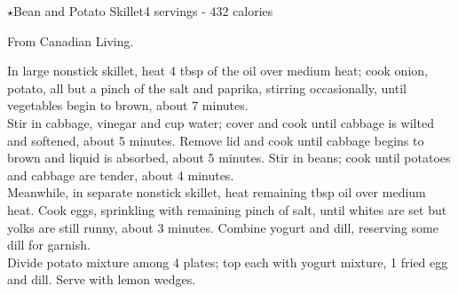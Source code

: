 \begin{recipe}{\texorpdfstring{$\star$}{str}Bean and Potato Skillet}{4 servings - 432 calories}{}

\freeform From Canadian Living.


In large nonstick skillet, heat 4 tbsp of the oil over medium heat; cook onion, potato, all but a pinch of the salt and paprika, stirring occasionally, until vegetables begin to brown, about 7 minutes.\\

Stir in cabbage, vinegar and  cup water; cover and cook until cabbage is wilted and softened, about 5 minutes. Remove lid and cook until cabbage begins to brown and liquid is absorbed, about 5 minutes. Stir in beans; cook until potatoes and cabbage are tender, about 4 minutes.\\

Meanwhile, in separate nonstick skillet, heat remaining  tbsp oil over medium heat. Cook eggs, sprinkling with remaining pinch of salt, until whites are set but yolks are still runny, about 3 minutes. Combine yogurt and dill, reserving some dill for garnish.\\

Divide potato mixture among 4 plates; top each with yogurt mixture, 1 fried egg and dill. Serve with lemon wedges.

\end{recipe}